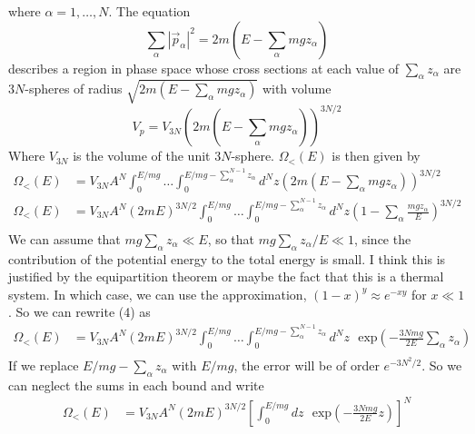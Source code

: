 \documentclass[]{book}
\begin{document}
\begin{enumerate}[1)]
\begin{equation}
\end{equation}
where $\alpha = 1,\dots, N$. The equation
\begin{equation}
\sum_\alpha |\vec{p}_\alpha|^2 = 2m(E -  \sum_\alpha mgz_\alpha)
\end{equation}
describes a region in phase space whose cross sections at each value of $\sum_\alpha z_\alpha$ are $3N$-spheres of radius $\sqrt{2m(E -  \sum_\alpha mgz_\alpha)}$ with volume
\begin{equation}
V_p = V_{3N}\left(2m(E -  \sum_\alpha mgz_\alpha)\right)^{3N/2}
\end{equation}
Where $V_{3N}$ is the volume of the unit $3N$-sphere. $\Omega_<(E)$ is then given by
\begin{equation}
\begin{split}
\Omega_<(E) & =  V_{3N}A^N\int_0^{E/mg}\dots \int_0^{E/mg - \sum_\alpha^{N-1}z_\alpha}d^{N}z \left(2m(E -  \sum_\alpha mgz_\alpha)\right)^{3N/2} \\ 
\Omega_<(E) & =V_{3N}A^N\left( 2mE\right)^{3N/2}\int_0^{E/mg}\dots \int_0^{E/mg - \sum_\alpha^{N-1}z_\alpha}d^{N}z \left(1 -  \sum_\alpha \frac{mgz_\alpha}{E}\right)^{3N/2} \\ 
\end{split}
\end{equation}
We can assume that $mg\sum_\alpha z_\alpha \ll E$, so that $mg\sum_\alpha z_\alpha /E \ll 1$, since the contribution of the potential energy to the total energy is small. I think this is justified by the equipartition theorem or maybe the fact that this is a thermal system. In which case, we can use the approximation, $(1-x)^y \approx e^{-xy}$ for $x \ll 1$. So we can rewrite (4) as
\begin{equation}
\begin{split}
\Omega_<(E) & =V_{3N}A^N\left( 2mE\right)^{3N/2}\int_0^{E/mg}\dots \int_0^{E/mg - \sum_\alpha^{N-1}z_\alpha}d^{N}z    \text{ } \text{exp}\left( -\frac{3Nmg}{2E} \sum_\alpha z_\alpha \right) \\
\end{split}
\end{equation}
If we replace $E/mg - \sum_\alpha z_\alpha$ with $E/mg$, the error will be of order $e^{-3N^2/2}$. So we can neglect the sums in each bound and write
\begin{equation}
\begin{split}
\Omega_<(E) & =V_{3N}A^N\left( 2mE\right)^{3N/2} \left[ \int_0^{E/mg} dz    \text{ } \text{exp}\left( -\frac{3Nmg}{2E} z \right) \right]^N \\

\end{split}
\end{equation}
\end{enumerate}
\end{document}
